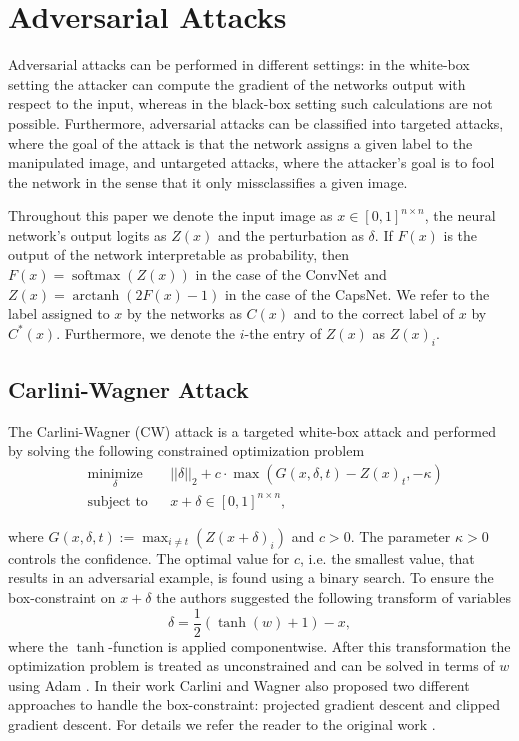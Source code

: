 \documentclass{article}
\DeclareMathOperator\arctanh{arctanh}
\DeclareMathOperator\softmax{softmax}
\begin{document}
\section{Adversarial Attacks}
\label{lab:attacks}

Adversarial attacks can be performed in different settings: in the white-box setting the attacker can compute the gradient of the networks output with respect to the input, whereas in the black-box setting such calculations are not possible. Furthermore, adversarial attacks can be classified into targeted attacks, where the goal of the attack is that the network assigns a given label to the manipulated image, and untargeted attacks, where the attacker's goal is to fool the network in the sense that it only missclassifies a given image.

Throughout this paper we denote the input image as $x\in [0,1]^{n\times n}$, the neural network's output logits as $Z(x)$ and the perturbation as $\delta$. If $F(x)$ is the output of the network interpretable as probability, then
$F(x) = \softmax (Z(x))$ in the case of the ConvNet and $Z(x) = \arctanh(2F(x) - 1)$ in the case of the CapsNet. We refer to the label assigned to $x$ by the networks as $C(x)$  and to the correct label of $x$ by $C^*(x)$. Furthermore, we denote the $i$-the entry of $Z(x)$ as $Z(x)_i$.

\subsection{Carlini-Wagner Attack}

The Carlini-Wagner (CW) attack  is a targeted white-box attack and performed by solving the following constrained optimization problem
\begin{equation}
\begin{aligned}
& \underset{\delta}{\text{minimize}}
& & ||\delta||_2 + c \cdot \max(G(x,\delta,t)-Z(x)_t, -\kappa) \\
& \text{subject to}
& & x+\delta \in [0,1]^{n \times n},
\end{aligned}
\end{equation}

where $G(x,\delta,t) := \max_{i\neq t}(Z(x+\delta)_i)$ and $c>0$. The parameter  $\kappa > 0$ controls the confidence. The optimal value for $c$, i.e. the smallest value, that results in an adversarial example, is found using a binary search. To ensure the box-constraint on $x+\delta$ the authors suggested the following transform of variables 
\begin{equation}
\delta = \frac{1}{2}(\tanh(w)+1)-x,
\end{equation} 
where the $\tanh$-function is applied componentwise. After this transformation the optimization problem is treated as unconstrained and can be solved in terms of $w$ using Adam \cite{adam}. In their work Carlini and Wagner also proposed two different approaches to handle the box-constraint: projected gradient descent and clipped gradient descent. For details we refer the reader to the original work \cite{carlini}.
\end{document}
